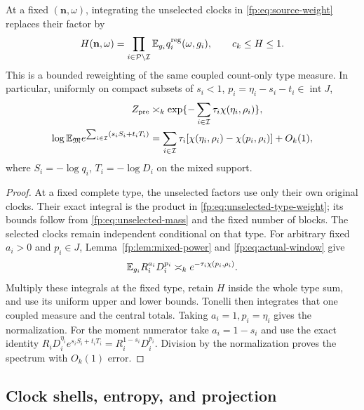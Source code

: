 \begin{lemma}
\label{fp:lem:unselected-integration}
At a fixed $(\mathbf n,\omega)$, integrating the unselected
clocks in \eqref{fp:eq:source-weight} replaces their factor by
\begin{equation}
 H(\mathbf n,\omega)
   =\prod_{i\in\mathcal P\setminus\mathcal I}
                     \mathbb E_{g_i}q_i^{\rm reg}(\omega,g_i),
 \qquad c_k\le H\le1.
 \label{fp:eq:unselected-type-weight}
\end{equation}
This is a bounded reweighting of the same coupled count-only type
measure. In particular, uniformly on compact subsets of
$s_i<1$, $p_i=\eta_i-s_i-t_i\in\operatorname{int}J$,
\begin{align}
 Z_{\rm pre}&\asymp_k
       \exp\{-\sum_{i\in\mathcal I}\tau_i\chi(\eta_i,\rho_i)\},
       \label{fp:eq:complete-source-Z}\\
 \log\mathbb E_{\mathfrak M}
       e^{\sum_{i\in\mathcal I}(s_iS_i+t_iT_i)}
   &=\sum_{i\in\mathcal I}\tau_i
       [\chi(\eta_i,\rho_i)-\chi(p_i,\rho_i)]+O_k(1),
       \label{fp:eq:complete-source-spectrum}
\end{align}
where $S_i=-\log q_i$, $T_i=-\log D_i$ on the mixed support.
\end{lemma}
\begin{proof}
At a fixed complete type, the unselected factors use only their
own original clocks. Their exact integral is the product in
\eqref{fp:eq:unselected-type-weight}; its bounds follow from
\eqref{fp:eq:unselected-mass} and the fixed number of blocks.
The selected clocks remain independent conditional on that type.
For arbitrary fixed $a_i>0$ and $p_i\in J$, Lemma~\ref{fp:lem:mixed-power}
and \eqref{fp:eq:actual-window} give
\[
 \mathbb E_{g_i}R_i^{a_i}D_i^{p_i}
      \asymp_k e^{-\tau_i\chi(p_i,\rho_i)}.
\]
Multiply these integrals at the fixed type, retain $H$ inside the
whole type sum, and use its uniform upper and lower bounds. Tonelli
then integrates that one coupled measure and the central totals.
Taking $a_i=1,p_i=\eta_i$ gives the normalization. For the moment
numerator take $a_i=1-s_i$ and use the exact identity
$R_iD_i^{\eta_i}e^{s_iS_i+t_iT_i}=R_i^{1-s_i}D_i^{p_i}$.
Division by the normalization proves the spectrum with $O_k(1)$
error.
\end{proof}

\subsection{Clock shells, entropy, and projection}

